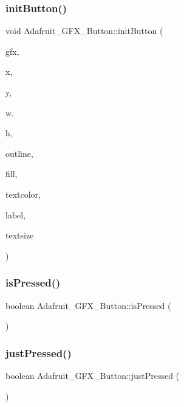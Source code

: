 \subsubsection{\texorpdfstring{init\+Button()}{initButton()}}
{\footnotesize\ttfamily void Adafruit\+\_\+\+G\+F\+X\+\_\+\+Button\+::init\+Button (\begin{DoxyParamCaption}\item[{\hyperlink{class_adafruit___g_f_x}{Adafruit\+\_\+\+G\+FX} $\ast$}]{gfx,  }\item[{int16\+\_\+t}]{x,  }\item[{int16\+\_\+t}]{y,  }\item[{uint8\+\_\+t}]{w,  }\item[{uint8\+\_\+t}]{h,  }\item[{uint16\+\_\+t}]{outline,  }\item[{uint16\+\_\+t}]{fill,  }\item[{uint16\+\_\+t}]{textcolor,  }\item[{char $\ast$}]{label,  }\item[{uint8\+\_\+t}]{textsize }\end{DoxyParamCaption})}

\mbox{\label{class_adafruit___g_f_x___button_a1faefaf249e868786a416bc097e2cf07}} 
\subsubsection{\texorpdfstring{is\+Pressed()}{isPressed()}}
{\footnotesize\ttfamily boolean Adafruit\+\_\+\+G\+F\+X\+\_\+\+Button\+::is\+Pressed (\begin{DoxyParamCaption}{ }\end{DoxyParamCaption})}

\mbox{\label{class_adafruit___g_f_x___button_a41bcfc81edaf30a11d171a69e7e7c679}} 
\subsubsection{\texorpdfstring{just\+Pressed()}{justPressed()}}
{\footnotesize\ttfamily boolean Adafruit\+\_\+\+G\+F\+X\+\_\+\+Button\+::just\+Pressed (\begin{DoxyParamCaption}{ }\end{DoxyParamCaption})}


